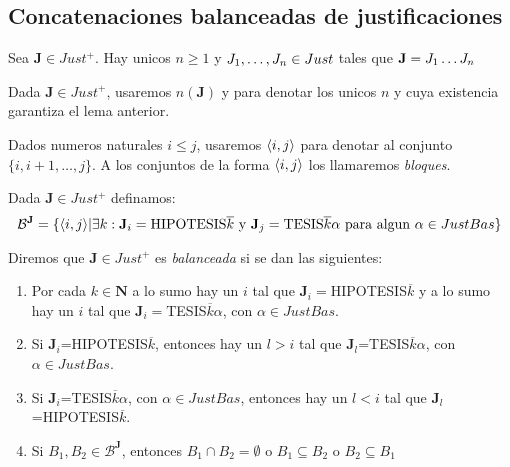 \subsection{Concatenaciones balanceadas de justificaciones}
\begin{lemma}
  Sea $\mathbf{J}\in Just^+$. Hay unicos $n\geq1$ y $\succession{J}{1}{n}\in Just$ tales que $\mathbf{J}=\succession[]{J}{1}{n}$
\end{lemma}
\noproof
\begin{definition}
  Dada $\mathbf{J}\in Just^+$, usaremos $n(\mathbf{J})$ y  para denotar los unicos $n$ y  cuya existencia 
  garantiza el lema anterior.
\end{definition}
\begin{definition}
  Dados numeros naturales $i\leq j$, usaremos $\bloq{i}{j}$ para denotar al conjunto $\{i,i+1,\dots,j\}$. A los conjuntos de la forma $\bloq{i}{j}$
  los llamaremos \emph{bloques}.
\end{definition}

\begin{definition}
  Dada $\mathbf{J}\in Just^+$ definamos:
  $$
  \mathcal{B}^\mathbf{J}=\{\bloq{i}{j} | \exists k : \mathbf{J}_i = \text{HIPOTESIS}\overline{k} \text{ y } \mathbf{J}_j=\text{TESIS}\overline{k}\alpha \text{ para algun } \alpha \in JustBas\}
  $$
\end{definition}

\begin{definition}
  Diremos que $\mathbf{J}\in Just^+$ es \emph{balanceada} si se dan las siguientes:
  \begin{enumerate}
    \item Por cada $k \in \mathbf{N}$ a lo sumo hay un $i$ tal que $\mathbf{J}_i=$HIPOTESIS$\overline{k}$ y a lo sumo hay un $i$ tal que $\mathbf{J}_i=$TESIS$\overline{k}\alpha$, con $\alpha \in JustBas$.
    \item Si $\mathbf{J}_i$=HIPOTESIS$\overline{k}$, entonces hay un $l > i$ tal que $\mathbf{J}_l$=TESIS$\overline{k}\alpha$, con $\alpha\in JustBas$.
    \item Si $\mathbf{J}_i$=TESIS$\overline{k}\alpha$, con $\alpha\in JustBas$, entonces hay un $l < i$ tal que $\mathbf{J}_l$=HIPOTESIS$\overline{k}$.
    \item Si $B_1,B_2\in\mathcal{B}^\mathbf{J}$, entonces $B_1\cap B_2=\emptyset$ o $B_1\subseteq B_2$ o $B_2\subseteq B_1$
  \end{enumerate}
\end{definition}
